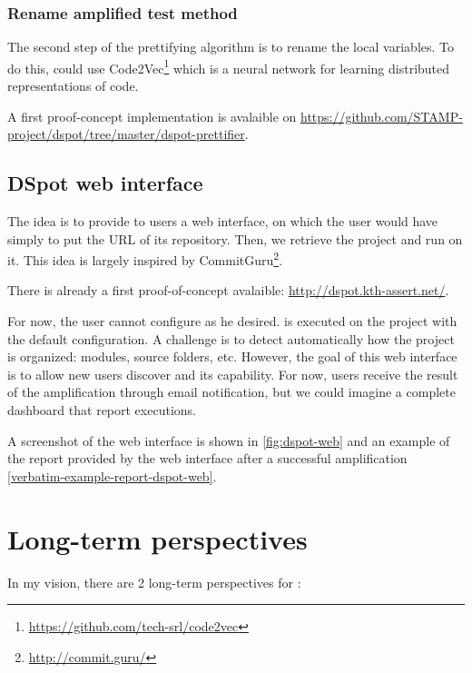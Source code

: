 \subsubsection{Rename amplified test method}
\label{subsubsec:conclusion:short-prespectives:prettifier:rename-method}

The second step of the prettifying algorithm is to rename the local variables.
To do this, \dspotprettifier could use Code2Vec\footnote{\url{https://github.com/tech-srl/code2vec}}\cite{DBLP:journals/corr/abs-1803-09473} which is a neural network for learning distributed representations of code.

A first proof-concept implementation is avalaible on \url{https://github.com/STAMP-project/dspot/tree/master/dspot-prettifier}.

\subsection{DSpot web interface}
\label{subsec:conclusion:short-prespectives:web-interface}
The idea is to provide to users a web interface, on which the user would have simply to put the URL of its \gh repository.
Then, we retrieve the project and run \dspot on it.
This idea is largely inspired by CommitGuru\footnote{\url{http://commit.guru/}}\cite{Rosen:2015:FSE}.

There is already a first proof-of-concept avalaible: \url{http://dspot.kth-assert.net/}.

For now, the user cannot configure \dspot as he desired.
\dspot is executed on the project with the default configuration.
A challenge is to detect automatically how the project is organized: modules, source folders, etc.
However, the goal of this web interface is to allow new users discover \dspot and its capability.
For now, users receive the result of the amplification through email notification, but we could imagine a complete dashboard that report \dspot executions.

A screenshot of the web interface is shown in \autoref{fig:dspot-web} and an example of the report provided by the web interface after a successful amplification \autoref{verbatim-example-report-dspot-web}.

\section{Long-term perspectives}
\label{sec:conclusion:long-prespectives}

In my vision, there are 2 long-term perspectives for \dspot:

